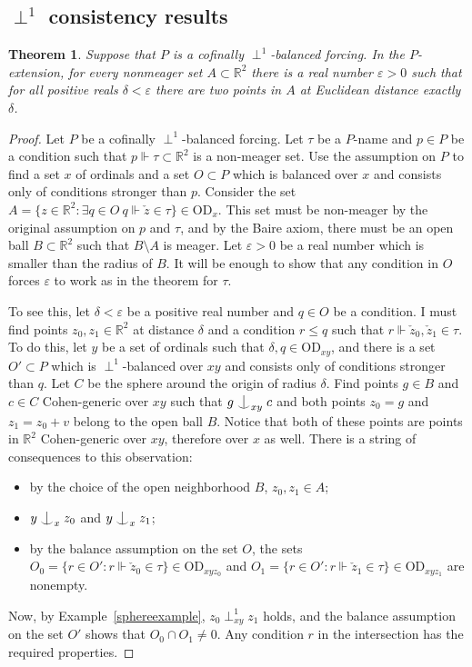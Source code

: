 \documentclass{article}
\newcommand{\gd}{\delta}
\newcommand{\eps}{\varepsilon}
\newcommand{\vd}{\mathrm{OD}}
\newcommand{\forkindep}[1][]{%
  \mathrel{
    \mathop{
      \vcenter{
        \hbox{\oalign{\noalign{\kern-.3ex}\hfil$\vert$\hfil\cr
              \noalign{\kern-.7ex}
              $\smile$\cr\noalign{\kern-.3ex}}}
      }
    }\displaylimits_{#1}
  }
}
\newtheorem{theorem}{Theorem}[section]
\theoremstyle{definition}
\begin{document}
\subsection{$\perp^1$ consistency results}

\begin{theorem}
Suppose that $P$ is a cofinally $\perp^1$-balanced forcing. In the $P$-extension, for every nonmeager set $A\subset \mathbb{R}^2$ there is a real number $\eps>0$ such that for all positive reals $\gd<\eps$ there are two points in $A$ at Euclidean distance exactly $\delta$.
\end{theorem}

\begin{proof}
Let $P$ be a cofinally $\perp^1$-balanced forcing. Let $\tau$ be a $P$-name and $p\in P$ be a condition such that $p\Vdash\tau\subset\mathbb{R}^2$ is a non-meager set. Use the assumption on $P$ to find a set $x$ of ordinals and a set $O\subset P$ which is balanced over $x$ and consists only of conditions stronger than $p$. Consider the set $A=\{z\in\mathbb{R}^2\colon\exists q\in O\ q\Vdash \check z\in\tau\}\in\vd_x$. This set must be non-meager by the original assumption on $p$ and $\tau$, and by the Baire axiom, there must be an open ball $B\subset\mathbb{R}^2$ such that $B\setminus A$ is meager. Let $\eps>0$ be a real number which is smaller than the radius of $B$. It will be enough to show that any condition in $O$ forces $\eps$ to work as in the theorem for $\tau$.

To see this, let $\gd<\eps$ be a positive real number and $q\in O$ be a condition. I must find points $z_0, z_1\in\mathbb{R}^2$ at distance $\gd$ and a condition $r\leq q$ such that $r\Vdash \check z_0, \check z_1\in\tau$. To do this, let $y$ be a set of ordinals such that $\gd, q\in\vd_{xy}$, and there is a set $O'\subset P$ which is $\perp^1$-balanced over $xy$ and consists only of conditions stronger than $q$. 
Let $C$ be the sphere around the origin of radius $\gd$. Find points $g\in B$ and $c\in C$ Cohen-generic over ${xy}$ such that $g\forkindep_{xy} c$ and both points $z_0=g$ and $z_1=z_0+v$ belong to the open ball $B$. Notice that both of these points are points in $\mathbb{R}^2$ Cohen-generic over ${xy}$, therefore over $x$ as well. There is a string of consequences to this observation:

\begin{itemize}
\item by the choice of the open neighborhood $B$, $z_0, z_1\in A$;
\item $y\forkindep_xz_0$ and $y\forkindep_xz_1$;
\item by the balance assumption on the set $O$, the sets $O_0=\{r\in O'\colon r\Vdash\check z_0\in\tau\}\in\vd_{xyz_0}$ and $O_1=\{r\in O'\colon r\Vdash\check z_1\in\tau\}\in\vd_{xyz_1}$ are nonempty.
\end{itemize}

\noindent Now, by Example~\ref{sphereexample}, $z_0\perp^1_{xy}z_1$ holds, and the balance assumption on the set $O'$ shows that $O_0\cap O_1\neq 0$. Any condition $r$ in the intersection has the required properties.
\end{proof}
\end{document}
